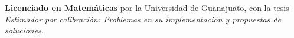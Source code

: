 \documentclass[]{friggeri-cv}
\begin{document}
\begin{entrylist}
{\begin{tabular}{l}
	\end{tabular}
    }
    {\vspace{-1.49cm}}
    { }
    {\textbf{Licenciado en Matemáticas} por la Universidad de Guanajuato, con la tesis \textsl{Estimador por calibración: Problemas en su implementación y propuestas de soluciones}.}
    \end{entrylist}
\vspace{-0.5cm}
\end{document}
